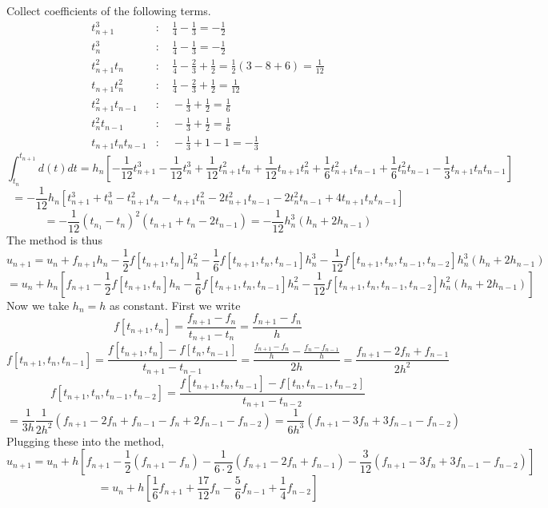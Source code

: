 \documentclass{article}
\newcommand{\sbr}[1]{\left[#1\right]}
\begin{document}
Collect coefficients of the following terms.
\begin{align*}
t_{n+1}^3 &: \quad \frac14 - \frac13 = -\frac12\\
t_n^3 &: \quad \frac14 - \frac13 = -\frac12\\
t_{n+1}^2t_n &: \quad \frac14 - \frac23 + \frac12 = \frac12(3-8+6) = \frac1{12}\\
t_{n+1}t_n^2 &: \quad \frac14 - \frac23 + \frac12 = \frac1{12}\\
t_{n+1}^2t_{n-1} &: \quad -\frac13 + \frac12 = \frac16\\
t_n^2t_{n-1} &: \quad -\frac13 + \frac12 = \frac16\\
t_{n+1}t_nt_{n-1} &: \quad -\frac13 + 1 - 1 = -\frac13
\end{align*}
$$\int_{t_n}^{t_{n+1}}d(t)dt = h_n\sbr{-\frac1{12}t_{n+1}^3 - \frac1{12}t_n^3 + \frac1{12}t_{n+1}^2t_n + \frac1{12}t_{n+1}t_n^2 + \frac16t_{n+1}^2t_{n-1} + \frac16t_n^2t_{n-1} - \frac13t_{n+1}t_nt_{n-1}}$$
$$= -\frac1{12}h_n\sbr{t_{n+1}^3 + t_n^3 - t_{n+1}^2t_n - t_{n+1}t_n^2 - 2t_{n+1}^2t_{n-1} - 2t_n^2t_{n-1} + 4t_{n+1}t_nt_{n-1}}$$
$$= -\frac1{12}(t_{n_1}-t_n)^2(t_{n+1}+t_n-2t_{n-1})
= -\frac1{12}h_n^3(h_n+2h_{n-1})$$
The method is thus
$$u_{n+1} = u_n + f_{n+1}h_n - \frac12f[t_{n+1},t_n]h_n^2 - \frac16f[t_{n+1},t_n,t_{n-1}]h_n^3 - \frac1{12}f[t_{n+1},t_n,t_{n-1},t_{n-2}]h_n^3(h_n+2h_{n-1})$$
$$= \boxed{u_n + h_n\sbr{f_{n+1} - \frac12f[t_{n+1},t_n]h_n - \frac16f[t_{n+1},t_n,t_{n-1}]h_n^2 - \frac1{12}f[t_{n+1},t_n,t_{n-1},t_{n-2}]h_n^2(h_n+2h_{n-1})}}$$
Now we take $h_n=h$ as constant. First we write
$$f[t_{n+1},t_n] = \frac{f_{n+1}-f_n}{t_{n+1}-t_n} = \frac{f_{n+1}-f_n}{h}$$
$$f[t_{n+1},t_n,t_{n-1}] = \frac{f[t_{n+1},t_n]-f[t_n,t_{n-1}]}{t_{n+1}-t_{n-1}}
= \frac{\frac{f_{n+1}-f_n}{h}-\frac{f_n-f_{n-1}}{h}}{2h}
= \frac{f_{n+1}-2f_n+f_{n-1}}{2h^2}$$
$$f[t_{n+1},t_n,t_{n-1},t_{n-2}] = \frac{f[t_{n+1},t_n,t_{n-1}]-f[t_n,t_{n-1},t_{n-2}]}{t_{n+1}-t_{n-2}}$$
$$= \frac1{3h}\frac1{2h^2}(f_{n+1}-2f_n+f_{n-1}-f_n+2f_{n-1}-f_{n-2})
= \frac1{6h^3}(f_{n+1}-3f_n+3f_{n-1}-f_{n-2})$$
Plugging these into the method,
$$u_{n+1} = u_n + h\sbr{f_{n+1} - \frac12(f_{n+1}-f_n) - \frac1{6\cdot2}(f_{n+1}-2f_n+f_{n-1}) - \frac3{12}(f_{n+1}-3f_n+3f_{n-1}-f_{n-2})}$$
$$= \boxed{u_n + h\sbr{\frac16f_{n+1} + \frac{17}{12}f_n - \frac56f_{n-1} + \frac14f_{n-2}}}$$
\end{document}
